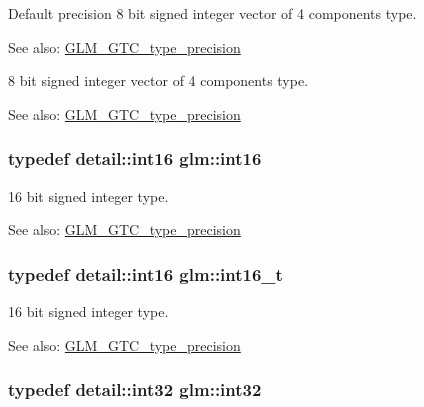 Default precision 8 bit signed integer vector of 4 components type. \begin{Desc}
\item[See also:]\hyperlink{group__gtc__type__precision}{GLM\_\-GTC\_\-type\_\-precision}\end{Desc}
8 bit signed integer vector of 4 components type. \begin{Desc}
\item[See also:]\hyperlink{group__gtc__type__precision}{GLM\_\-GTC\_\-type\_\-precision} \end{Desc}
\hypertarget{group__gtc__type__precision_g2945a61d12771f8954994fcddf02b021}{
\subsubsection[int16]{\setlength{\rightskip}{0pt plus 5cm}typedef detail::int16 {\bf glm::int16}}}
\label{group__gtc__type__precision_g2945a61d12771f8954994fcddf02b021}


16 bit signed integer type. \begin{Desc}
\item[See also:]\hyperlink{group__gtc__type__precision}{GLM\_\-GTC\_\-type\_\-precision} \end{Desc}
\hypertarget{group__gtc__type__precision_gf89ee61e0d34aa4a462104b7ae7f2da6}{
\subsubsection[int16\_\-t]{\setlength{\rightskip}{0pt plus 5cm}typedef detail::int16 {\bf glm::int16\_\-t}}}
\label{group__gtc__type__precision_gf89ee61e0d34aa4a462104b7ae7f2da6}


16 bit signed integer type. \begin{Desc}
\item[See also:]\hyperlink{group__gtc__type__precision}{GLM\_\-GTC\_\-type\_\-precision} \end{Desc}
\hypertarget{group__gtc__type__precision_g632d8b25f6b61659f39ea4321fab92a4}{
\subsubsection[int32]{\setlength{\rightskip}{0pt plus 5cm}typedef detail::int32 {\bf glm::int32}}}
\label{group__gtc__type__precision_g632d8b25f6b61659f39ea4321fab92a4}


